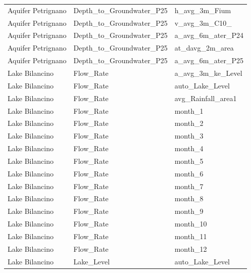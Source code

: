 \documentclass{article}
\begin{document}
\begin{table}
{\begin{tabular}{lll}
 Aquifer Petrignano &   Depth\_to\_Groundwater\_P25 &                   h\_avg\_3m\_Fium \\
 Aquifer Petrignano &   Depth\_to\_Groundwater\_P25 &                   v\_avg\_3m\_C10\_ \\
 Aquifer Petrignano &   Depth\_to\_Groundwater\_P25 &               a\_avg\_6m\_ater\_P24 \\
 Aquifer Petrignano &   Depth\_to\_Groundwater\_P25 &                 at\_davg\_2m\_area \\
 Aquifer Petrignano &   Depth\_to\_Groundwater\_P25 &               a\_avg\_6m\_ater\_P25 \\
     Lake Bilancino &                  Flow\_Rate &               a\_avg\_3m\_ke\_Level \\
     Lake Bilancino &                  Flow\_Rate &                 auto\_Lake\_Level \\
     Lake Bilancino &                  Flow\_Rate &              avg\_Rainfall\_area1 \\
     Lake Bilancino &                  Flow\_Rate &                         month\_1 \\
     Lake Bilancino &                  Flow\_Rate &                         month\_2 \\
     Lake Bilancino &                  Flow\_Rate &                         month\_3 \\
     Lake Bilancino &                  Flow\_Rate &                         month\_4 \\
     Lake Bilancino &                  Flow\_Rate &                         month\_5 \\
     Lake Bilancino &                  Flow\_Rate &                         month\_6 \\
     Lake Bilancino &                  Flow\_Rate &                         month\_7 \\
     Lake Bilancino &                  Flow\_Rate &                         month\_8 \\
     Lake Bilancino &                  Flow\_Rate &                         month\_9 \\
     Lake Bilancino &                  Flow\_Rate &                        month\_10 \\
     Lake Bilancino &                  Flow\_Rate &                        month\_11 \\
     Lake Bilancino &                  Flow\_Rate &                        month\_12 \\
     Lake Bilancino &                 Lake\_Level &                 auto\_Lake\_Level \\

\end{tabular}}
\end{table}
\end{document}
